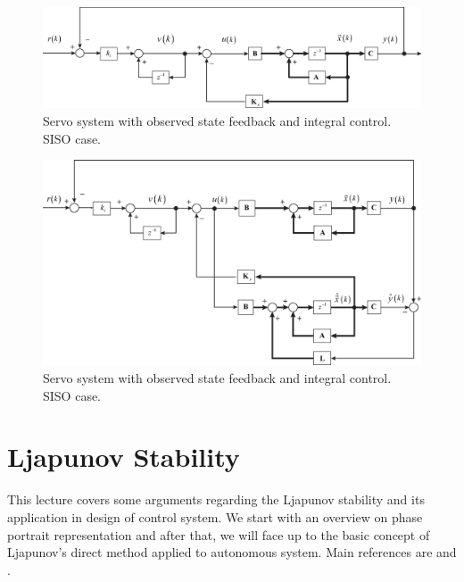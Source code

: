 \documentclass[11pt,a4paper,oneside]{book}
\numberwithin{equation}{section}
\theoremstyle{it}
\theoremstyle{definition}
\begin{document}
\begin{figure}[H]
	\centering
	\includegraphics[width = 475pt, 
	keepaspectratio,angle=0]{figures/servo_3.eps}
	\captionsetup{width=0.5\textwidth, font=small}
	\caption{Servo system with observed state feedback and integral control. SISO case.}
	\label{figure_servo_3}
\end{figure}
\begin{figure}[H]
	\centering
	\includegraphics[width = 475pt, 
	keepaspectratio,angle=0]{figures/servo_4.eps}
	\captionsetup{width=0.5\textwidth, font=small}
	\caption{Servo system with observed state feedback and integral control. SISO case.}
	\label{figure_servo_4}
\end{figure}

\chapter{Ljapunov Stability} 
This lecture covers some arguments regarding the Ljapunov stability and its 
application in design of control system. We start with an overview on phase 
portrait representation and after that, we will face up to the basic concept of 
Ljapunov's direct method applied to autonomous system. Main references are 
\cite{p27} and \cite{p28}.
\end{document}
